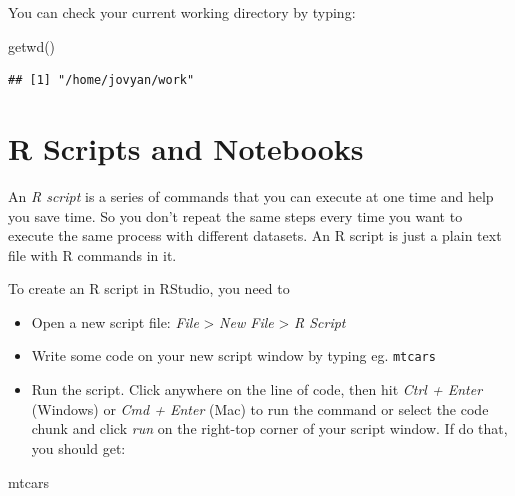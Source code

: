 \documentclass[
]{book}
\newenvironment{Shaded}{\begin{snugshade}}{\end{snugshade}}
\newcommand{\FunctionTok}[1]{\textcolor[rgb]{0.00,0.00,0.00}{#1}}
\newcommand{\NormalTok}[1]{#1}
\begin{document}
You can check your current working directory by typing:

\begin{Shaded}
\begin{Highlighting}[]
\FunctionTok{getwd}\NormalTok{()}
\end{Highlighting}
\end{Shaded}

\begin{verbatim}
## [1] "/home/jovyan/work"
\end{verbatim}

\hypertarget{r-scripts-and-notebooks}{%
\section{R Scripts and Notebooks}\label{r-scripts-and-notebooks}}

An \emph{R script} is a series of commands that you can execute at one time and help you save time. So you don't repeat the same steps every time you want to execute the same process with different datasets. An R script is just a plain text file with R commands in it.

To create an R script in RStudio, you need to

\begin{itemize}
\item
  Open a new script file: \emph{File} \textgreater{} \emph{New File} \textgreater{} \emph{R Script}
\item
  Write some code on your new script window by typing eg. \texttt{mtcars}
\item
  Run the script. Click anywhere on the line of code, then hit \emph{Ctrl + Enter} (Windows) or \emph{Cmd + Enter} (Mac) to run the command or select the code chunk and click \emph{run} on the right-top corner of your script window. If do that, you should get:
\end{itemize}

\begin{Shaded}
\begin{Highlighting}[]
\NormalTok{mtcars}
\end{Highlighting}
\end{Shaded}
\end{document}
